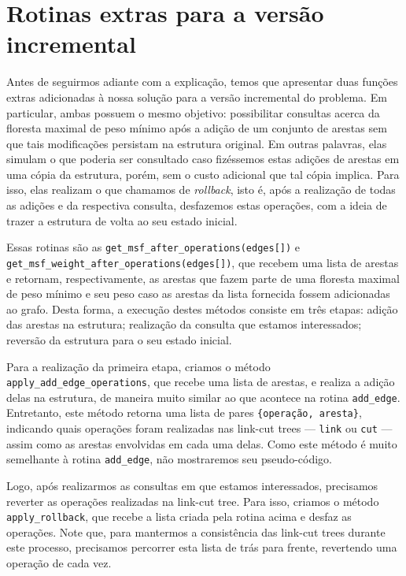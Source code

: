 \section{Rotinas extras para a versão incremental}
\label{sec:rmsf-extras}

Antes de seguirmos adiante com a explicação, temos que apresentar duas funções extras adicionadas à nossa solução para a versão incremental do problema. Em particular, ambas possuem o mesmo objetivo: possibilitar consultas acerca da floresta maximal de peso mínimo após a adição de um conjunto de arestas sem que tais modificações persistam na estrutura original. Em outras palavras, elas simulam o que poderia ser consultado caso fizéssemos estas adições de arestas em uma cópia da estrutura, porém, sem o custo adicional que tal cópia implica. Para isso, elas realizam o que chamamos de \emph{rollback}, isto é, após a realização de todas as adições e da respectiva consulta, desfazemos estas operações, com a ideia de trazer a estrutura de volta ao seu estado inicial.

Essas rotinas são as \texttt{get\_msf\_after\_operations(edges[])} e \texttt{get\_msf\_weight\_after\_operations(edges[])}, que recebem uma lista de arestas e retornam, respectivamente, as arestas que fazem parte de uma floresta maximal de peso mínimo e seu peso caso as arestas da lista fornecida fossem adicionadas ao grafo. Desta forma, a execução destes métodos consiste em três etapas: adição das arestas na estrutura; realização da consulta que estamos interessados; reversão da estrutura para o seu estado inicial.

Para a realização da primeira etapa, criamos o método \texttt{apply\_add\_edge\_operations}, que recebe uma lista de arestas, e realiza a adição delas na estrutura, de maneira muito similar ao que acontece na rotina \texttt{add\_edge}. Entretanto, este método retorna uma lista de pares \texttt{\{operação, aresta\}}, indicando quais operações foram realizadas nas link-cut trees --- \texttt{link} ou \texttt{cut} --- assim como as arestas envolvidas em cada uma delas. Como este método é muito semelhante à rotina \texttt{add\_edge}, não mostraremos seu pseudo-código.

Logo, após realizarmos as consultas em que estamos interessados, precisamos reverter as operações realizadas na link-cut tree. Para isso, criamos o método \texttt{apply\_rollback}, que recebe a lista criada pela rotina acima e desfaz as operações. Note que, para mantermos a consistência das link-cut trees durante este processo, precisamos percorrer esta lista de trás para frente, revertendo uma operação de cada vez.

